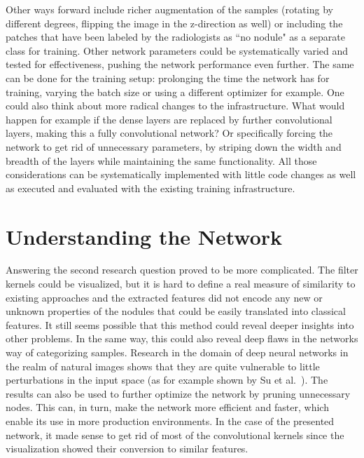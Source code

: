 \documentclass[main.tex]{subfiles}
\begin{document}
Other ways forward include richer augmentation of the samples (rotating by different degrees, flipping the image in the z-direction as well) or including the patches that have been labeled by the radiologists as ``no nodule" as a separate class for training. Other network parameters could be systematically varied and tested for effectiveness, pushing the network performance even further. The same can be done for the training setup: prolonging the time the network has for training, varying the batch size or using a different optimizer for example. One could also think about more radical changes to the infrastructure. What would happen for example if the dense layers are replaced by further convolutional layers, making this a fully convolutional network? Or specifically forcing the network to get rid of unnecessary parameters, by striping down the width and breadth of the layers while maintaining the same functionality. All those considerations can be systematically implemented with little code changes as well as executed and evaluated with the existing training infrastructure.

\section{Understanding the Network}
Answering the second research question proved to be more complicated. The filter kernels could be visualized, but it is hard to define a real measure of similarity to existing approaches and the extracted features did not encode any new or unknown properties of the nodules that could be easily translated into classical features. It still seems possible that this method could reveal deeper insights into other problems. In the same way, this could also reveal deep flaws in the networks way of categorizing samples. Research in the domain of deep neural networks in the realm of natural images shows that they are quite vulnerable to little perturbations in the input space (as for example shown by Su et al.~\cite{su2017one}). The results can also be used to further optimize the network by pruning unnecessary nodes. This can, in turn, make the network more efficient and faster, which enable its use in more production environments. In the case of the presented network, it made sense to get rid of most of the convolutional kernels since the visualization showed their conversion to similar features.
\end{document}
